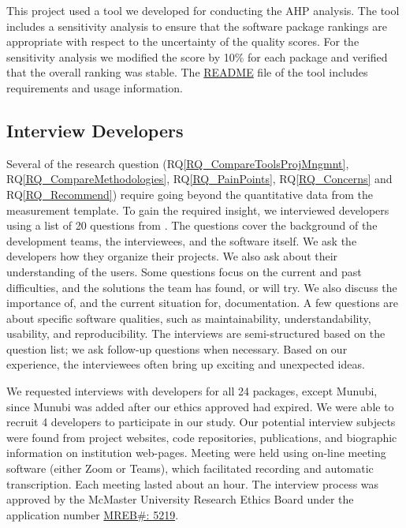 \documentclass[final, 3p, times, authoryear]{elsarticle}
\newcommand{\rqref}[1]{RQ\ref{#1}}
\begin{document}
This project used a tool we developed for conducting the AHP analysis. The tool
includes a sensitivity analysis to ensure that the software package rankings are
appropriate with respect to the uncertainty of the quality scores. For the
sensitivity analysis we modified the score by 10\% for each package and verified
that the overall ranking was stable.  The
\href{https://github.com/smiths/AIMSS/blob/master/StateOfPractice/AHP2020/LBM/README.txt}{README}
file of the tool includes requirements and usage information.

\subsection{Interview Developers} \label{SecSurvey}

Several of the research question (\rqref{RQ_CompareToolsProjMngmnt},
\rqref{RQ_CompareMethodologies}, \rqref{RQ_PainPoints}, \rqref{RQ_Concerns} and
\rqref{RQ_Recommend}) require going beyond the quantitative data from the
measurement template. To gain the required insight, we interviewed developers
using a list of 20 questions from \citet{SmithEtAl2021}. The questions cover the
background of the development teams, the interviewees, and the software itself.
We ask the developers how they organize their projects. We also ask about their
understanding of the users. Some questions focus on the current and past
difficulties, and the solutions the team has found, or will try. We also discuss
the importance of, and the current situation for, documentation. A few questions
are about specific software qualities, such as maintainability,
understandability, usability, and reproducibility. The interviews are
semi-structured based on the question list; we ask follow-up questions when
necessary. Based on our experience, the interviewees often bring up exciting and
unexpected ideas.

We requested interviews with developers for all 24 packages, except Munubi,
since Munubi was added after our ethics approved had expired.  We were able to
recruit 4 developers to participate in our study.  Our potential interview
subjects were found from project websites, code repositories, publications, and
biographic information on institution web-pages. Meeting were held using on-line
meeting software (either Zoom or Teams), which facilitated recording and
automatic transcription.  Each meeting lasted about an hour. The interview
process was approved by the McMaster University Research Ethics Board under the
application number 
\href{https://github.com/smiths/AIMSS/blob/master/StateOfPractice/MACREM/Application.pdf}
{MREB\#: 5219}.
\end{document}
